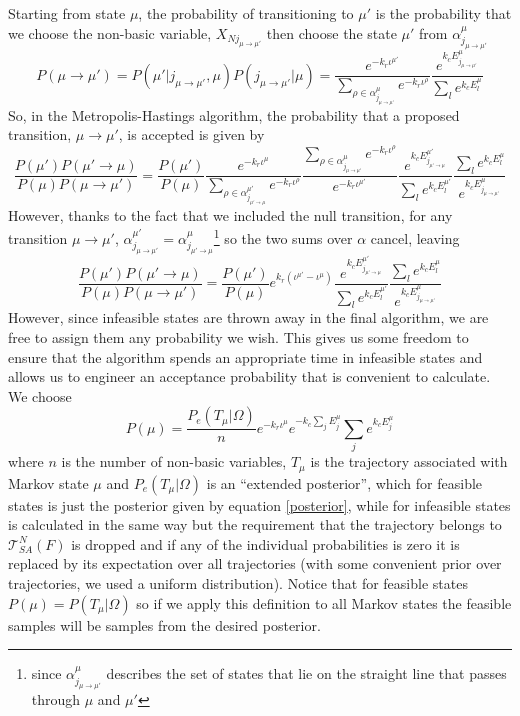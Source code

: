 \documentclass{article}
\begin{document}
Starting from state $\mu$, the probability of transitioning to $\mu'$ is the probability that we choose the non-basic variable, $X_{Nj_{\mu\to\mu'}}$ then choose the state $\mu'$ from $\alpha^\mu_{j_{\mu\to\mu'}}$
\[
P(\mu \rightarrow \mu') = P(\mu'|j_{\mu\to\mu'},\mu)P(j_{\mu\to\mu'}|\mu) =
\frac{e^{-k_r \iota^{\mu'}}}{\sum_{\rho \in \alpha^\mu_{j_{\mu\to\mu'}}}e^{-k_r\iota^\rho}}
\frac{e^{k_c E^\mu_{j_{\mu\to\mu'}}}}{\sum_l e^{k_c E^\mu_l}}
\]
So, in the Metropolis-Hastings algorithm, the probability that a proposed transition, $\mu\to\mu'$, is accepted is given by
\[
\frac{P(\mu')P(\mu'\to\mu)}{P(\mu)P(\mu\to\mu')} 
=
\frac{P(\mu')}{P(\mu)}
\frac{e^{-k_r \iota^{\mu}}}{\sum_{\rho \in \alpha^{\mu'}_{j_{\mu'\to\mu}}}e^{-k_r\iota^\rho}}
\frac{\sum_{\rho \in \alpha^{\mu}_{j_{\mu\to\mu'}}}e^{-k_r\iota^\rho}}{e^{-k_r \iota^{\mu'}}}
\frac{e^{k_c E^{\mu'}_{j_{\mu'\to\mu}}}}{\sum_l e^{k_c E^{\mu'}_l}}
\frac{\sum_l e^{k_c E^\mu_l}}{e^{k_c E^\mu_{j_{\mu\to\mu'}}}}
\]
However, thanks to the fact that we included the null transition, for any transition $\mu\to\mu'$,  $\alpha^{\mu'}_{j_{\mu\to\mu'}} = \alpha^\mu_{j_{\mu'\to\mu}}$\footnote{since $\alpha^\mu_{j_{\mu\to\mu'}}$ describes the set of states that lie on the straight line that passes through $\mu$ and $\mu'$} so the two sums over $\alpha$ cancel, leaving
\begin{equation}
\frac{P(\mu')P(\mu'\to\mu)}{P(\mu)P(\mu\to\mu')} 
=
\frac{P(\mu')}{P(\mu)}
e^{k_r (\iota^{\mu'} - \iota^{\mu})}
\frac{e^{k_c E^{\mu'}_{j_{\mu'\to\mu}}}}{\sum_l e^{k_c E^{\mu'}_l}}
\frac{\sum_l e^{k_c E^\mu_l}}{e^{k_c E^\mu_{j_{\mu\to\mu'}}}}
\label{acceptance1}
\end{equation}
However, since infeasible states are thrown away in the final algorithm, we are free to assign them any probability we wish. This gives us some freedom to ensure that the algorithm spends an appropriate time in infeasible states and allows us to engineer an acceptance probability that is convenient to calculate. We choose
\begin{equation}
P(\mu) = 
\frac{P_e(T_\mu|\Omega)}{n}
e^{-k_r\iota^\mu}
e^{-k_c\sum_j E^\mu_j} 
\sum_j e^{k_c E^\mu_j}
\label{penalty}
\end{equation}
where $n$ is the number of non-basic variables, $T_\mu$ is the trajectory associated with Markov state $\mu$ and $P_e(T_\mu|\Omega)$ is an ``extended posterior'', which for feasible states is just the posterior given by equation \ref{posterior}, while for infeasible states is calculated in the same way but the requirement that the trajectory belongs to $\mathcal{T}^N_{SA}(F)$ is dropped and if any of the individual probabilities is zero it is replaced by its expectation over all trajectories (with some convenient prior over trajectories, we used a uniform distribution). Notice that for feasible states $P(\mu) = P(T_\mu|\Omega)$ so if we apply this definition to all Markov states the feasible samples will be samples from the desired posterior.
\end{document}
